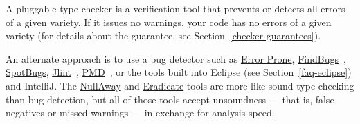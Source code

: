 




A pluggable type-checker
is a verification tool that prevents or detects all errors of a given
variety.  If it issues no warnings, your code has no errors of a given
variety (for details about the guarantee, see
Section~\ref{checker-guarantees}).

An alternate approach is to use a bug detector such as
\href{https://errorprone.info/}{Error Prone},
\href{https://findbugs.sourceforge.net/}{FindBugs}~\cite{HovemeyerP2004,HovemeyerSP2005},
\href{https://github.com/spotbugs/spotbugs}{SpotBugs},
\href{https://jlint.sourceforge.net/}{Jlint}~\cite{Artho2001},
\href{https://pmd.github.io/}{PMD}~\cite{Copeland2005},
or the
tools built into Eclipse (see Section~\ref{faq-eclipse}) and IntelliJ\@.
The \href{https://github.com/uber/NullAway}{NullAway} and
\href{https://fbinfer.com/docs/next/checker-eradicate/}{Eradicate} tools are more
like sound type-checking than bug detection, but all of those tools accept
unsoundness --- that is, false negatives or missed warnings --- in exchange
for analysis speed.

